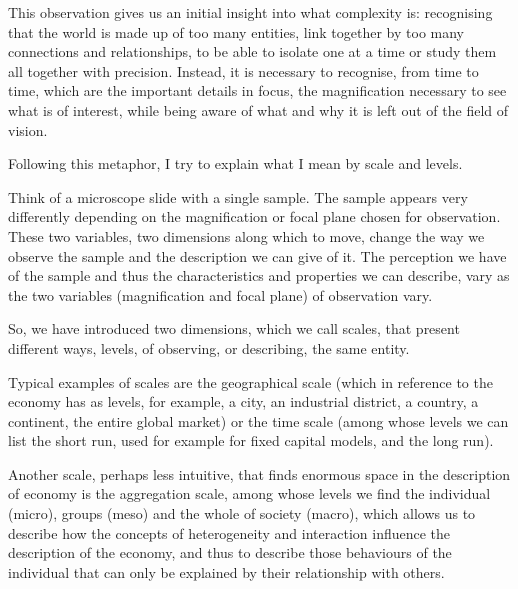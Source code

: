 \documentclass[a4paper, headings=standardclasses]{scrartcl}
\begin{document}
This observation gives us an initial insight into what complexity is: recognising that the world is made up of too many entities, link together by too many connections and relationships, to be able to isolate one at a time or study them all together with precision. Instead, it is necessary to recognise, from time to time, which are the important details in focus, the magnification necessary to see what is of interest, while being aware of what and why it is left out of the field of vision.

Following this metaphor, I try to explain what I mean by scale and levels.

Think of a microscope slide with a single sample. The sample appears
very differently depending on the magnification or focal plane chosen for observation.
These two variables, two dimensions along which to move, change the way we observe the sample and the description we can give of it.
The perception we have of the sample and thus the characteristics and properties we can
describe, vary as the two variables (magnification and focal plane) of observation vary.

So, we have introduced two dimensions, which we call scales, that present different ways, levels, of observing, or describing, the same entity.

Typical examples of scales are the geographical scale (which in reference to the economy has as levels, for example, a city, an industrial district, a country, a continent, the entire
global market) or the time scale (among whose levels we can list the short run, used for example for fixed capital models, and the long run).

Another scale, perhaps less intuitive, that finds enormous space in the description of economy is the aggregation scale, among whose levels we find the individual (micro), groups (meso) and the whole of society (macro), which allows us to describe how the concepts of heterogeneity and interaction influence the description of the economy, and thus to describe those behaviours of the individual that can only be explained by their relationship with others. 
\end{document}
